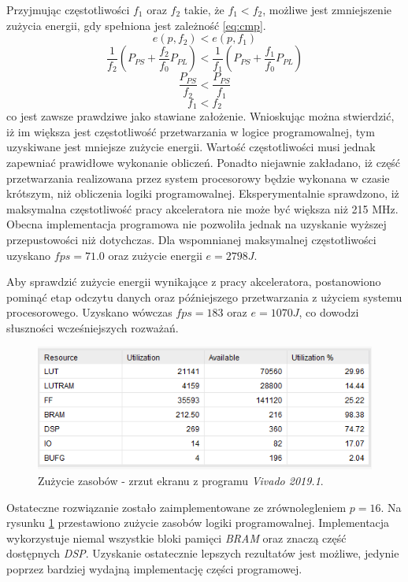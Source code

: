 Przyjmując częstotliwości $f_1$ oraz $f_2$ takie, że $f_1 < f_2$, możliwe jest zmniejszenie zużycia energii, gdy spełniona jest zależność \eqref{eq:cmp}.
\begin{equation}
e(p, f_2) < e(p,f_1)
\label{eq:cmp}
\end{equation}
\begin{equation}
\frac{1}{f_2}(P_{PS} + \frac{f_2}{f_0} P_{PL}) < 
\frac{1}{f_1}(P_{PS} + \frac{f_1}{f_0} P_{PL})
\end{equation}
\begin{equation}
\frac{P_{PS}}{f_2} < 
\frac{P_{PS}}{f_1}
\end{equation}
\begin{equation}
f_1 < f_2
\end{equation}
co jest zawsze prawdziwe jako stawiane założenie.
Wnioskując można stwierdzić, iż im większa jest częstotliwość przetwarzania w logice programowalnej, tym uzyskiwane jest mniejsze zużycie energii.
Wartość częstotliwości musi jednak zapewniać prawidłowe wykonanie obliczeń.
Ponadto niejawnie zakładano, iż część przetwarzania realizowana przez system procesorowy będzie wykonana w czasie krótszym, niż obliczenia logiki programowalnej.
Eksperymentalnie sprawdzono, iż maksymalna częstotliwość pracy akceleratora nie może być większa niż 215 MHz.
Obecna implementacja programowa nie pozwoliła jednak na uzyskanie wyższej przepustowości niż dotychczas.
Dla wspomnianej maksymalnej częstotliwości uzyskano $fps = 71.0$ oraz zużycie energii $e = 2798 J$.

Aby sprawdzić zużycie energii wynikające z pracy akceleratora, postanowiono pominąć etap odczytu danych oraz późniejszego przetwarzania z użyciem systemu procesorowego.
Uzyskano wówczas $fps = 183 $ oraz $e = 1070 J$, co dowodzi słuszności wcześniejszych rozważań.
 
 
\begin{figure}
    \centering
    \includegraphics[width=0.9\linewidth]{images/zasoby.png}
    \caption{Zużycie zasobów - zrzut ekranu z programu \emph{Vivado 2019.1}.}
    \label{fig:resources}
\end{figure}

Ostateczne rozwiązanie zostało zaimplementowane ze zrównolegleniem $p = 16$.
Na rysunku \ref{fig:resources} przestawiono zużycie zasobów logiki programowalnej.
Implementacja wykorzystuje niemal wszystkie bloki pamięci \emph{BRAM} oraz znaczą część dostępnych \emph{DSP}.
Uzyskanie ostatecznie lepszych rezultatów jest możliwe, jedynie poprzez bardziej wydajną implementację części programowej.



